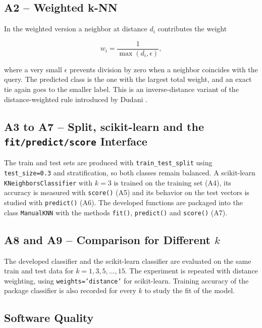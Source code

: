 \documentclass[conference]{IEEEtran}
\begin{document}
\subsection{A2 -- Weighted k-NN}

In the weighted version a neighbor at distance $d_i$ contributes the weight

\begin{equation}
w_i=\frac{1}{\max(d_i,\epsilon)},
\end{equation}

where a very small $\epsilon$ prevents division by zero when a neighbor coincides with the query. The predicted class is the one with the largest total weight, and an exact tie again goes to the smaller label. This is an inverse-distance variant of the distance-weighted rule introduced by Dudani \cite{dudani1976}.

\subsection{A3 to A7 -- Split, scikit-learn and the \texttt{fit/predict/score} Interface}

The train and test sets are produced with \texttt{train\_test\_split} using \texttt{test\_size=0.3} and stratification, so both classes remain balanced. A scikit-learn \texttt{KNeighborsClassifier} \cite{sklearn} with $k=3$ is trained on the training set (A4), its accuracy is measured with \texttt{score()} (A5) and its behavior on the test vectors is studied with \texttt{predict()} (A6). The developed functions are packaged into the class \texttt{ManualKNN} with the methods \texttt{fit()}, \texttt{predict()} and \texttt{score()} (A7).

\subsection{A8 and A9 -- Comparison for Different $k$}

The developed classifier and the scikit-learn classifier are evaluated on the same train and test data for $k=1,3,5,\dots,15$. The experiment is repeated with distance weighting, using \texttt{weights='distance'} for scikit-learn. Training accuracy of the package classifier is also recorded for every $k$ to study the fit of the model.

\subsection{Software Quality}
\end{document}
